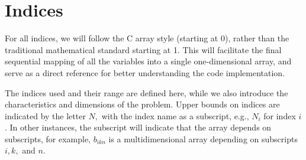 \documentclass[fleqn,12pt]{report}
\begin{document}
\section{Indices}
For all indices, we will follow the C array style (starting at 0),
rather than the traditional mathematical standard starting at 1.
This will facilitate the final
sequential mapping of all the variables into a single one-dimensional array,
and serve as a direct reference for better understanding the code implementation.

The indices used and their range are defined here, while we also
introduce the characteristics and dimensions of the problem.
Upper bounds on indices are indicated by the letter $N,$ with the
index name as a subscript, e.g., $N_i$ for index $i$. In other instances,
the subscript will indicate that the array depends on subscripts, for example,
$b_{ikn}$ is a multidimensional array depending on subscripts $i, k,$ and $n$.
\end{document}
